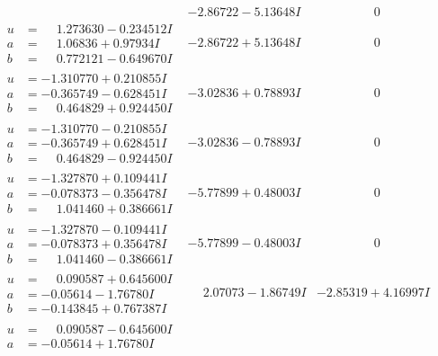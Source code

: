 \documentclass[1p]{elsarticle_modified}
\theoremstyle{definition}
\begin{document}
$$\begin{array}{c|c|c}
 & -2.86722 - 5.13648 I & \phantom{-0.000000 } 0 \\ \hline\begin{aligned}
u &= \phantom{-}1.273630 - 0.234512 I \\
a &= \phantom{-}1.06836 + 0.97934 I \\
b &= \phantom{-}0.772121 - 0.649670 I\end{aligned}
 & -2.86722 + 5.13648 I & \phantom{-0.000000 } 0 \\ \hline\begin{aligned}
u &= -1.310770 + 0.210855 I \\
a &= -0.365749 - 0.628451 I \\
b &= \phantom{-}0.464829 + 0.924450 I\end{aligned}
 & -3.02836 + 0.78893 I & \phantom{-0.000000 } 0 \\ \hline\begin{aligned}
u &= -1.310770 - 0.210855 I \\
a &= -0.365749 + 0.628451 I \\
b &= \phantom{-}0.464829 - 0.924450 I\end{aligned}
 & -3.02836 - 0.78893 I & \phantom{-0.000000 } 0 \\ \hline\begin{aligned}
u &= -1.327870 + 0.109441 I \\
a &= -0.078373 - 0.356478 I \\
b &= \phantom{-}1.041460 + 0.386661 I\end{aligned}
 & -5.77899 + 0.48003 I & \phantom{-0.000000 } 0 \\ \hline\begin{aligned}
u &= -1.327870 - 0.109441 I \\
a &= -0.078373 + 0.356478 I \\
b &= \phantom{-}1.041460 - 0.386661 I\end{aligned}
 & -5.77899 - 0.48003 I & \phantom{-0.000000 } 0 \\ \hline\begin{aligned}
u &= \phantom{-}0.090587 + 0.645600 I \\
a &= -0.05614 - 1.76780 I \\
b &= -0.143845 + 0.767387 I\end{aligned}
 & \phantom{-}2.07073 - 1.86749 I & -2.85319 + 4.16997 I \\ \hline\begin{aligned}
u &= \phantom{-}0.090587 - 0.645600 I \\
a &= -0.05614 + 1.76780 I \\

\end{aligned}
\end{array}$$
\end{document}
